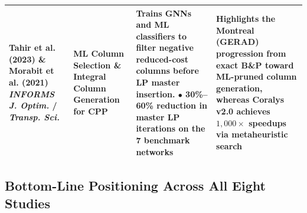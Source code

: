 \documentclass[journal]{IEEEtran}
\begin{document}
\begin{table}[t]
{\begin{tabular}{p{3.2cm}p{3.0cm}p{6.5cm}p{6.5cm}}
\midrule
Tahir et al. (2023) \cite{tahir2023} \& Morabit et al. (2021) \cite{morabit2021} \newline \emph{INFORMS J. Optim.} / \emph{Transp. Sci.} & ML Column Selection \& Integral Column Generation for CPP & Trains GNNs and ML classifiers to filter negative reduced-cost columns before LP master insertion. \newline $\bullet$ 30\%--60\% reduction in master LP iterations on the 7 benchmark networks & Highlights the Montreal (GERAD) progression from exact B\&P toward ML-pruned column generation, whereas Coralys v2.0 achieves $1,000\times$ speedups via metaheuristic search \\
\bottomrule
\end{tabular}%
}
\end{table}

\subsection{Bottom-Line Positioning Across All Eight Studies}
\label{sec:bottom_line_positioning}
\end{document}
